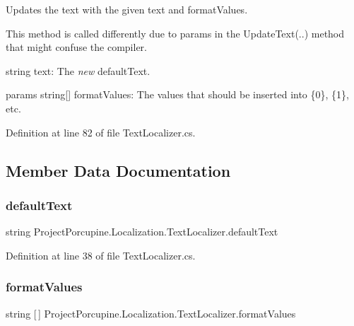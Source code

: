 Updates the text with the given text and format\+Values. 

This method is called differently due to params in the Update\+Text(..) method that might confuse the compiler. 

string text\+: The {\itshape new} default\+Text. 

params string\mbox{[}\mbox{]} format\+Values\+: The values that should be inserted into \{0\}, \{1\}, etc. 

Definition at line 82 of file Text\+Localizer.\+cs.



\subsection{Member Data Documentation}
\mbox{\label{class_project_porcupine_1_1_localization_1_1_text_localizer_a3efa9cab9be2045d92967ad827ceffe9}} 
\subsubsection{\texorpdfstring{default\+Text}{defaultText}}
{\footnotesize\ttfamily string Project\+Porcupine.\+Localization.\+Text\+Localizer.\+default\+Text}



Definition at line 38 of file Text\+Localizer.\+cs.

\mbox{\label{class_project_porcupine_1_1_localization_1_1_text_localizer_aeddc75ef9f9461cd60bcf5f44e93dc82}} 
\subsubsection{\texorpdfstring{format\+Values}{formatValues}}
{\footnotesize\ttfamily string \mbox{[}$\,$\mbox{]} Project\+Porcupine.\+Localization.\+Text\+Localizer.\+format\+Values}



